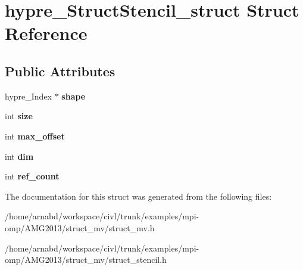 \hypertarget{structhypre__StructStencil__struct}{}\section{hypre\+\_\+\+Struct\+Stencil\+\_\+struct Struct Reference}
\label{structhypre__StructStencil__struct}
\subsection*{Public Attributes}
\begin{DoxyCompactItemize}
\item 
\hypertarget{structhypre__StructStencil__struct_add7dd3abb1ca0ab8695976b20b3d8797}{}hypre\+\_\+\+Index $\ast$ {\bfseries shape}\label{structhypre__StructStencil__struct_add7dd3abb1ca0ab8695976b20b3d8797}

\item 
\hypertarget{structhypre__StructStencil__struct_a54beb46bbdf92a032ab53748e25f32f8}{}int {\bfseries size}\label{structhypre__StructStencil__struct_a54beb46bbdf92a032ab53748e25f32f8}

\item 
\hypertarget{structhypre__StructStencil__struct_ad66331714caac9e485514cefbface24b}{}int {\bfseries max\+\_\+offset}\label{structhypre__StructStencil__struct_ad66331714caac9e485514cefbface24b}

\item 
\hypertarget{structhypre__StructStencil__struct_a982faaf31004c49fd52a5c2663ef3a52}{}int {\bfseries dim}\label{structhypre__StructStencil__struct_a982faaf31004c49fd52a5c2663ef3a52}

\item 
\hypertarget{structhypre__StructStencil__struct_ad0941498db41f039e44175a30228bc26}{}int {\bfseries ref\+\_\+count}\label{structhypre__StructStencil__struct_ad0941498db41f039e44175a30228bc26}

\end{DoxyCompactItemize}


The documentation for this struct was generated from the following files\+:\begin{DoxyCompactItemize}
\item 
/home/arnabd/workspace/civl/trunk/examples/mpi-\/omp/\+A\+M\+G2013/struct\+\_\+mv/struct\+\_\+mv.\+h\item 
/home/arnabd/workspace/civl/trunk/examples/mpi-\/omp/\+A\+M\+G2013/struct\+\_\+mv/struct\+\_\+stencil.\+h\end{DoxyCompactItemize}
